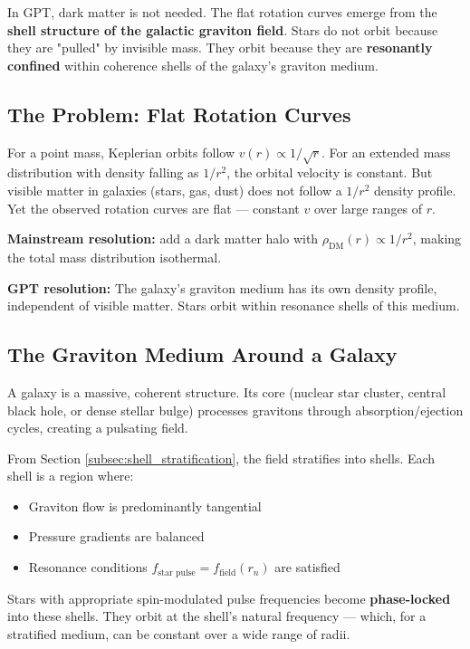 \documentclass[12pt, a4paper]{article}
\begin{document}
In GPT, dark matter is not needed. The flat rotation curves emerge from the \textbf{shell structure of the galactic graviton field}. Stars do not orbit because they are "pulled" by invisible mass. They orbit because they are \textbf{resonantly confined} within coherence shells of the galaxy's graviton medium.

\subsection{The Problem: Flat Rotation Curves}
\label{subsec:flat_rotation_problem}

For a point mass, Keplerian orbits follow \( v(r) \propto 1/\sqrt{r} \). For an extended mass distribution with density falling as \( 1/r^2 \), the orbital velocity is constant. But visible matter in galaxies (stars, gas, dust) does not follow a \( 1/r^2 \) density profile. Yet the observed rotation curves are flat — constant \( v \) over large ranges of \( r \).

\textbf{Mainstream resolution:} add a dark matter halo with \( \rho_{\text{DM}}(r) \propto 1/r^2 \), making the total mass distribution isothermal.

\textbf{GPT resolution:} The galaxy's graviton medium has its own density profile, independent of visible matter. Stars orbit within resonance shells of this medium.

\subsection{The Graviton Medium Around a Galaxy}
\label{subsec:galactic_medium}

A galaxy is a massive, coherent structure. Its core (nuclear star cluster, central black hole, or dense stellar bulge) processes gravitons through absorption/ejection cycles, creating a pulsating field.

From Section \ref{subsec:shell_stratification}, the field stratifies into shells. Each shell is a region where:
\begin{itemize}
    \item Graviton flow is predominantly tangential
    \item Pressure gradients are balanced
    \item Resonance conditions \( f_{\text{star pulse}} = f_{\text{field}}(r_n) \) are satisfied
\end{itemize}

Stars with appropriate spin-modulated pulse frequencies become \textbf{phase-locked} into these shells. They orbit at the shell's natural frequency — which, for a stratified medium, can be constant over a wide range of radii.
\end{document}
